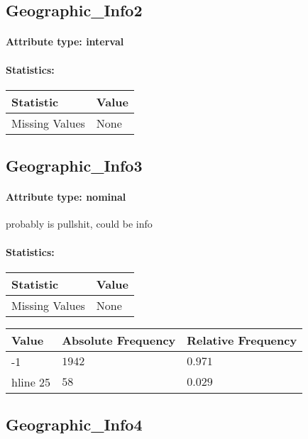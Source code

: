 \subsection{Geographic\_Info2}
\paragraph{Attribute type: interval}
\paragraph{Statistics: }
\begin{table}[H]
	\renewcommand{\arraystretch}{1.25}
	\begin{tabular}{l|l}
		\textbf{Statistic} & \textbf{Value}\\\hline
		Missing Values& None\\\hline
	\end{tabular}
\end{table}

\subsection{Geographic\_Info3}
\paragraph{Attribute type: nominal} probably is pullshit, could be info
\paragraph{Statistics: }
\begin{table}[H]
	\renewcommand{\arraystretch}{1.25}
	\begin{tabular}{l|l}
		\textbf{Statistic} & \textbf{Value}\\\hline
		Missing Values& None\\\hline
	\end{tabular}
\end{table}
\begin{table}[H]
	\renewcommand{\arraystretch}{1.25}
	\begin{tabular}{l|l|l}
		\textbf{Value} & \textbf{Absolute Frequency} & \textbf{Relative Frequency}\\\hline
		-1&$1942$&$0.971$\\hline
		25&$58$&$0.029$
	\end{tabular}
\end{table}

\subsection{Geographic\_Info4}
